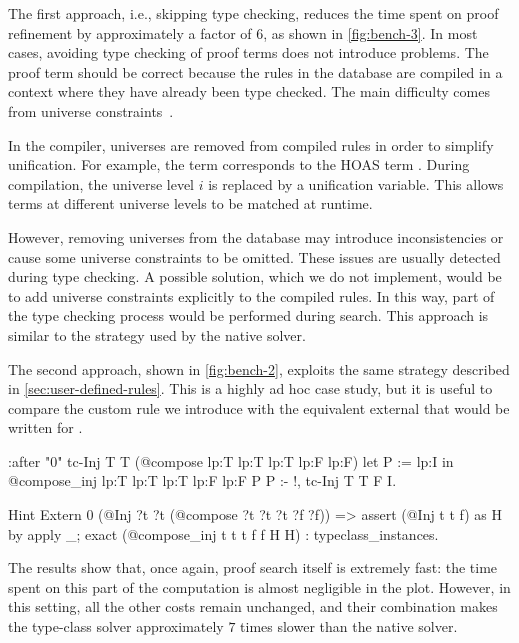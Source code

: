 The first approach, i.e., skipping type checking, reduces the time spent on
proof refinement by approximately a factor of $6$, as shown in
\cref{fig:bench-3}. In most cases, avoiding type checking of proof terms does
not introduce problems. The proof term should be correct because the rules in
the database are compiled in a context where they have already been type
checked. The main difficulty comes from universe constraints~\cite{universes}.

In the \elpi compiler, universes are removed from compiled rules in order to
simplify unification. For example, the \rocq term  corresponds to
the HOAS term . During compilation, the universe level $i$ is
replaced by a unification variable. This allows terms at different universe
levels to be matched at runtime.

However, removing universes from the database may introduce inconsistencies or
cause some universe constraints to be omitted. These issues are usually
detected during type checking. A possible solution, which we do not implement,
would be to add universe constraints explicitly to the compiled rules. In this
way, part of the type checking process would be performed during search. This
approach is similar to the strategy used by the native \rocq solver.

The second approach, shown in \cref{fig:bench-2}, exploits the same strategy
described in \cref{sec:user-defined-rules}. This is a highly ad hoc case study,
but it is useful to compare the custom \elpi rule we introduce with the
equivalent external  that would be written for \rocq.

\begin{elpicode}
:after "0"
tc-Inj T T {{(@compose lp:T lp:T lp:T lp:F lp:F)}}
{{let P := lp:I in @compose_inj lp:T lp:T lp:T lp:F lp:F P P}} :- !,
tc-Inj T T F I.
\end{elpicode}

\begin{coqcode}
Hint Extern 0 (@Inj ?t ?t (@compose ?t ?t ?t ?f ?f)) =>
assert (@Inj t t f) as H by apply _;
exact (@compose_inj t t t f f H H) : typeclass_instances.
\end{coqcode}

The results show that, once again, proof search itself is extremely fast: the
time spent on this part of the computation is almost negligible in the plot.
However, in this setting, all the other costs remain unchanged, and their
combination makes the \elpi type-class solver approximately $7$ times slower
than the native \rocq solver.

